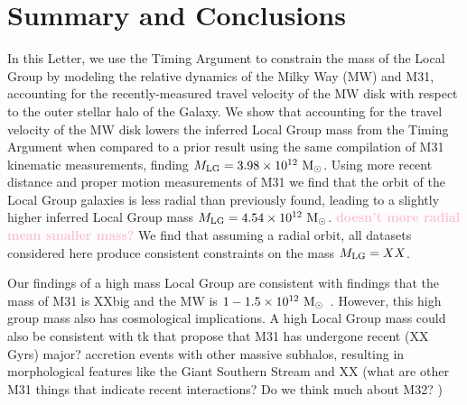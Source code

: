\documentclass[twocolumn]{aastex631}
\newcommand{\kc}[1]{\textcolor{pink}{\textbf{#1}} }
\newcommand{\mlg}{\ensuremath{M_{\rm LG}}}
\begin{document}
\section{Summary and Conclusions}
\label{sec:summary}

In this Letter, we use the Timing Argument to constrain the mass of the Local
Group by modeling the relative dynamics of the Milky Way (MW) and M31,
accounting for the recently-measured travel velocity of the MW disk with respect
to the outer stellar halo of the Galaxy.
We show that accounting for the travel velocity of the MW disk lowers the
inferred Local Group mass from the Timing Argument when compared to a prior
result using the same compilation of M31 kinematic measurements, finding $\mlg =
3.98\times 10^{12}~\Msun$.
Using more recent distance and proper motion measurements of M31 we find that
the orbit of the Local Group galaxies is less radial than previously found,
leading to a slightly higher inferred Local Group mass $\mlg = 4.54\times10^{12}~\Msun$. \kc{doesn't more radial mean smaller mass? }
We find that assuming a radial orbit, all datasets considered here produce
consistent constraints on the mass $\mlg = XX$.

Our findings of a high mass Local Group are consistent with findings that the
mass of M31 is XXbig and the MW is $1-1.5\times10^{12}~\mathrm{M}_\odot$~\citep{??}.
However, this high group mass also has cosmological implications.
A high Local Group mass could also be consistent with tk that propose that M31
has undergone recent (XX Gyrs) major? accretion events with other massive
subhalos, resulting in morphological features like the Giant Southern Stream and
XX (what are other M31 things that indicate recent interactions? Do we think
much about M32? )
\end{document}
